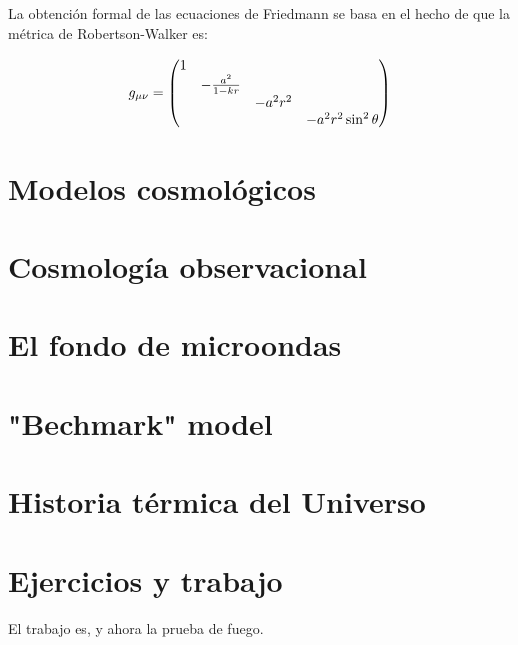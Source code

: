 La obtención formal de las ecuaciones de Friedmann se basa en el hecho de que la métrica de Robertson-Walker es:

\begin{equation}
    g_{\mu \nu} = \mqty(\dmat{1,-\frac{a^2}{1-kr},-a^2 r^2,-a^2 r^2 \sin^2 \theta})
\end{equation}

\section{Modelos cosmológicos}

\section{Cosmología observacional}

\section{El fondo de microondas}

\section{"Bechmark" model}

\section{Historia térmica del Universo}


\section{Ejercicios y trabajo}

El trabajo es, y ahora la prueba de fuego.